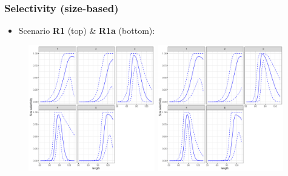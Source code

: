 \documentclass{beamer}
\begin{document}
\begin{frame}
    \frametitle{Selectivity (size-based)}
\begin{itemize}
    \item Scenario \textbf{R1} (top) \& \textbf{R1a} (bottom):
\end{itemize}
\vspace{0.25cm}
\begin{figure}
\begin{center}
       \includegraphics[width=5.5cm,height=5.5cm]{figs/case4_lengthsel.pdf} 
        \includegraphics[width=5.5cm,height=5.5cm]{figs/case4a_lengthsel.pdf} 
    \end{center}
\end{figure}
\end{frame}
\end{document}
